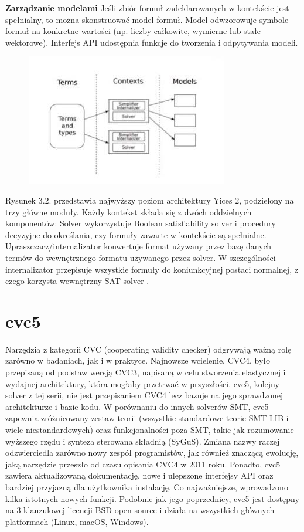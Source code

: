 \textbf{Zarządzanie modelami} Jeśli zbiór formuł zadeklarowanych w kontekście jest spełnialny, to można skonstruować model formuł. Model odwzorowuje symbole formuł na konkretne wartości (np. liczby całkowite, wymierne lub stałe wektorowe). Interfejs API udostępnia funkcje do tworzenia i odpytywania modeli.

\begin{figure}
	\centering
	\includegraphics[width=0.7\linewidth]{yices_architekture}
	\caption{}
	\label{fig:yices_architekture}
\end{figure}

Rysunek 3.2. przedstawia najwyższy poziom architektury Yices 2, podzielony na trzy główne moduły. Każdy kontekst składa się z dwóch oddzielnych komponentów: Solver wykorzystuje Boolean satisfiability solver i procedury decyzyjne do określania, czy formuły zawarte w kontekście są spełnialne. Upraszczacz/internalizator konwertuje format używany przez bazę danych termów do wewnętrznego formatu używanego przez solver. W szczególności
internalizator przepisuje wszystkie formuły do koniunkcyjnej postaci normalnej, z czego korzysta wewnętrzny SAT solver \cite{yices2.2}.


\section{cvc5}
Narzędzia z kategorii CVC (cooperating validity checker) odgrywają ważną rolę zarówno w badaniach, jak i w praktyce. Najnowsze wcielenie, CVC4, było przepisaną od podstaw wersją CVC3, napisaną w celu stworzenia elastycznej i wydajnej architektury, która mogłaby przetrwać w przyszłości. cvc5, kolejny solver z tej serii, nie jest
przepisaniem CVC4 lecz bazuje na jego sprawdzonej architekturze i bazie kodu. W porównaniu do innych solverów SMT, cvc5 zapewnia zróżnicowany zestaw teorii (wszystkie standardowe teorie SMT-LIB i wiele niestandardowych) oraz funkcjonalności poza SMT, takie jak rozumowanie wyższego rzędu i synteza sterowana składnią (SyGuS). Zmiana nazwy raczej odzwierciedla zarówno nowy zespół programistów, jak również znaczącą ewolucję, jaką narzędzie przeszło od czasu opisania CVC4 w 2011 roku. Ponadto, cvc5 zawiera aktualizowaną dokumentację, nowe i ulepszone interfejsy API oraz bardziej przyjazną dla użytkownika instalację. Co najważniejsze, wprowadzono kilka istotnych nowych funkcji. Podobnie jak jego poprzednicy, cvc5 jest dostępny na 3-klauzulowej licencji BSD open source i działa na wszystkich głównych platformach (Linux, macOS, Windows).


